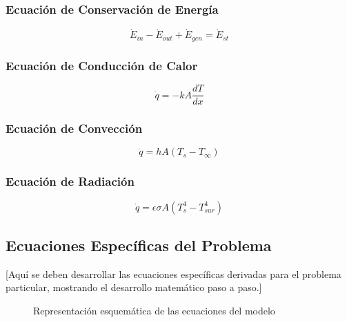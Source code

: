 \documentclass[12pt,letterpaper]{article}
\begin{document}
\subsubsection{Ecuación de Conservación de Energía}
\begin{equation}
    \dot{E}_{in} - \dot{E}_{out} + \dot{E}_{gen} = \dot{E}_{st}
    \label{eq:conservacion_energia}
\end{equation}

\subsubsection{Ecuación de Conducción de Calor}
\begin{equation}
    \dot{q} = -kA\frac{dT}{dx}
    \label{eq:conduccion}
\end{equation}

\subsubsection{Ecuación de Convección}
\begin{equation}
    \dot{q} = hA(T_s - T_{\infty})
    \label{eq:conveccion}
\end{equation}

\subsubsection{Ecuación de Radiación}
\begin{equation}
    \dot{q} = \epsilon\sigma A(T_s^4 - T_{sur}^4)
    \label{eq:radiacion}
\end{equation}

\subsection{Ecuaciones Específicas del Problema}
[Aquí se deben desarrollar las ecuaciones específicas derivadas para el problema particular, mostrando el desarrollo matemático paso a paso.]

\begin{figure}[H]
    \centering
    \caption{Representación esquemática de las ecuaciones del modelo}
    \label{fig:esquema_ecuaciones}
\end{figure}
\end{document}
